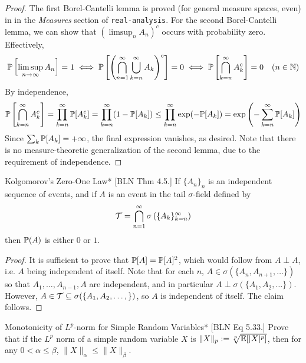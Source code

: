 \begin{proof}
    The first Borel-Cantelli lemma is proved (for general measure spaces, even) in in the \emph{Measures} section of \texttt{real-analysis}. For the second Borel-Cantelli lemma, we can show that \((\limsup_n A_n)^c\) occurs with probability zero. Effectively,
    \[
        \mathbb{P}\left[\limsup_{n \to \infty} A_n\right] = 1
        \iff \mathbb{P}\left[ \left(\bigcap_{n=1}^\infty \bigcup_{k=n}^\infty A_k\right)^c \right] = 0
        \iff \mathbb{P}\left[ \bigcap_{k=n}^\infty A_k^c \right] = 0
        \quad (n \in \mathbb{N})
    \]
    By independence,
    \[
        \mathbb{P}\left[ \bigcap_{k =n}^\infty A_k^c \right]
        = \prod_{k=n}^\infty \mathbb{P}[A_k^c]
        = \prod_{k=n}^\infty (1 - \mathbb{P}[A_k])
        \leq \prod_{k=n}^\infty \exp(-\mathbb{P}[A_k])
        = \exp\left( -\sum_{k=n}^\infty \mathbb{P}[A_k] \right)
    \]
    Since \(\sum_k \mathbb{P}[A_k] = +\infty\), the final expression vanishes, as desired. Note that there is no measure-theoretic generalization of the second lemma, due to the requirement of independence.
\end{proof}


\begin{problem}{Kolgomorov's Zero-One Law}*
    [BLN Thm 4.5.] If \(\{A_n\}_n\) is an independent sequence of events, and if \(A\) is an event in the tail \(\sigma\)-field defined by
    \[
        \mathcal{T} = \bigcap_{n=1}^\infty \sigma \left( \{A_k\}_{k=n}^\infty \right)
    \]
    then \(\mathbb{P}(A)\) is either \(0\) or \(1\).
\end{problem}

\begin{proof}
    It is sufficient to prove that \(\mathbb{P}[A] = \mathbb{P}[A]^2\), which would follow from \(A \perp A\), i.e. \(A\) being independent of itself. Note that for each \(n\), \(A \in \sigma(\{A_n, A_{n+1}, \dots\})\) so that \(A_1, \dots, A_{n-1}, A\) are independent, and in particular \(A \perp \sigma(\{A_1, A_2, \dots \})\). However, \(A \in \mathcal{T} \subseteq \sigma(\{A_1, A_2, \dots, \})\), so \(A\) is independent of itself. The claim follows. 
\end{proof}


\begin{problem}{Monotonicity of \(L^p\)-norm for Simple Random Variables}*
    [BLN Eq 5.33.] Prove that if the \(L^p\) norm of a simple random variable \(X\) is \(\|X\|_p := \sqrt[p]{\mathbb{E}[|X|^p]}\), then for any \(0 < \alpha \leq \beta\), \(\|X\|_\alpha \leq \|X\|_\beta\).
\end{problem}


